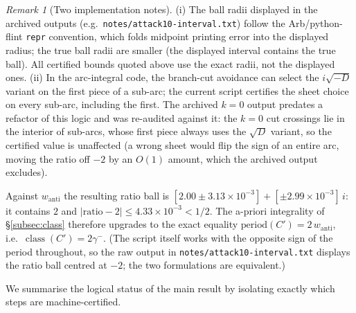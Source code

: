 \documentclass[11pt]{amsart}
\theoremstyle{definition}
\theoremstyle{remark}
\newtheorem{remark}[theorem]{Remark}
\DeclareMathOperator{\class}{class}
\begin{document}
\begin{remark}[Two implementation notes]\label{rem:disclosures}
(i) The ball radii displayed in the archived outputs
(e.g.\ \texttt{notes/attack10-interval.txt}) follow the Arb/python-flint
\texttt{repr} convention, which folds midpoint printing error into the
displayed radius; the true ball radii are smaller (the displayed interval
contains the true ball). All certified bounds quoted above use the exact
radii, not the displayed ones.
(ii) In the arc-integral code, the branch-cut avoidance can select the
$i\sqrt{-D}$ variant on the first piece of a sub-arc; the current script
certifies the sheet choice on every sub-arc, including the first. The
archived $k=0$ output predates a refactor of this logic and was re-audited
against it: the $k=0$ cut crossings lie in the interior of sub-arcs, whose
first piece always uses the $\sqrt D$ variant, so the certified value is
unaffected (a wrong sheet would flip the sign of an entire arc, moving the
ratio off $-2$ by an $O(1)$ amount, which the archived output excludes).
\end{remark}
Against $w_{\mathrm{anti}}$ the resulting ratio ball is
$[2.00\pm3.13\times10^{-3}]+[\pm2.99\times10^{-3}]\,i$: it contains $2$ and
$|\mathrm{ratio}-2|\le4.33\times10^{-3}<1/2$.  The a-priori integrality of
\S\ref{subsec:class} therefore upgrades to the exact equality
$\mathrm{period}(C')=2\,w_{\mathrm{anti}}$, i.e.\ $\class(C')=2\gamma^{-}$.
(The script itself works with the opposite sign of the period throughout, so
the raw output in \texttt{notes/attack10-interval.txt} displays the ratio
ball centred at $-2$; the two formulations are equivalent.)

We summarise the logical status of the main result by isolating exactly
which steps are machine-certified.
\end{document}
